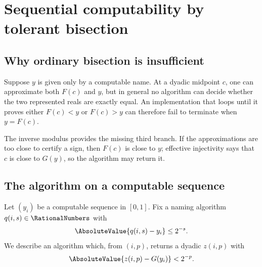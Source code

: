 \section{Sequential computability by tolerant bisection}
\label{co:sec:sequential}

\subsection{Why ordinary bisection is insufficient}

Suppose $y$ is given only by a computable name.  At a dyadic midpoint $c$,
one can approximate both $F(c)$ and $y$, but in general no algorithm can
decide whether the two represented reals are exactly equal.  An implementation
that loops until it proves either $F(c)<y$ or $F(c)>y$ can therefore fail to
terminate when $y=F(c)$.

The inverse modulus provides the missing third branch.  If the approximations
are too close to certify a sign, then $F(c)$ is close to $y$; effective
injectivity says that $c$ is close to $G(y)$, so the algorithm may return it.

\subsection{The algorithm on a computable sequence}

Let $(y_i)$ be a computable sequence in $[0,1]$.  Fix a naming algorithm
$q(i,s)\in\RationalNumbers$ with
\begin{equation}\label{co:eq:input-name}
 \AbsoluteValue{q(i,s)-y_i}\le2^{-s}.
\end{equation}
We describe an algorithm which, from $(i,p)$, returns a dyadic $z(i,p)$ with
\begin{equation}\label{co:eq:output-name-goal}
 \AbsoluteValue{z(i,p)-G(y_i)}<2^{-p}.
\end{equation}

